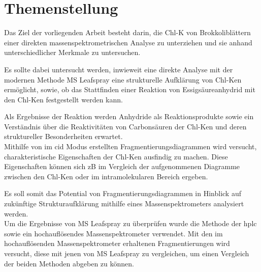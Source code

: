 \chapter{Themenstellung} \label{sec:Themenstellung}

Das Ziel der vorliegenden Arbeit besteht darin, die \gls{Chl-K} von Brokkoliblättern einer direkten massenspektrometrischen Analyse zu unterziehen und sie anhand unterschiedlicher Merkmale zu untersuchen.

Es sollte dabei untersucht werden, inwieweit eine direkte Analyse mit der modernen Methode MS Leafspray eine strukturelle Aufklärung von \gls{Chl-K}en ermöglicht, sowie, ob das Stattfinden einer Reaktion von Essigsäureanhydrid mit den \gls{Chl-K}en festgestellt werden kann. 

Als Ergebnisse der Reaktion werden Anhydride als Reaktionsprodukte sowie ein Verständnis über die Reaktivitäten von Carbonsäuren der \gls{Chl-K}en und deren struktureller Besonderheiten erwartet.\\

Mithilfe von im \gls{cid} Modus erstellten Fragmentierungsdiagrammen wird versucht, charakteristische Eigenschaften der \gls{Chl-K}en ausfindig zu machen. Diese Eigenschaften können sich \gls{zB} im Vergleich der aufgenommenen Diagramme zwischen den \gls{Chl-K}en oder im intramolekularen Bereich ergeben. 

Es soll somit das Potential von Fragmentierungsdiagrammen in Hinblick auf zukünftige Strukturaufklärung mithilfe eines Massenspektrometers analysiert werden. \\

Um die Ergebnisse von MS Leafspray zu überprüfen wurde die Methode der \gls{hplc} sowie ein hochauflösendes Massenspektrometer verwendet. Mit den im hochauflösenden Massenspektrometer erhaltenen Fragmentierungen wird versucht, diese mit jenen von MS Leafspray zu vergleichen, um einen Vergleich der beiden Methoden abgeben zu können.





